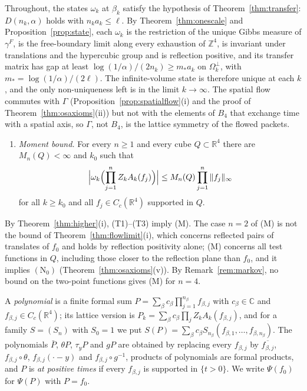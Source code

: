 \documentclass[aps,prd,twocolumn,superscriptaddress,nofootinbib,longbibliography,floatfix,amsmath,amssymb,10pt]{revtex4-2}
\theoremstyle{definition}
\theoremstyle{remark}
\newcommand{\R}{\mathbb{R}}
\newcommand{\Z}{\mathbb{Z}}
\newcommand{\C}{\mathbb{C}}
\begin{document}
Throughout, the states $\omega_k$ at $\beta_k$ satisfy the hypothesis of
Theorem~\ref{thm:transfer}: $D(n_k,\alpha)$ holds with $n_ka_k\le\ell$. By
Theorem~\ref{thm:onescale} and Proposition~\ref{prop:state}, each
$\omega_k$ is the restriction of the unique Gibbs measure of $\gamma^F$, is
the free-boundary limit along every exhaustion of $\Z^4$, is invariant under
translations and the hypercubic group and is reflection positive, and its
transfer matrix has gap at least $\log(1/\alpha)/(2n_k)\ge m_*a_k$ on
$\Omega_k^\perp$, with $m_*=\log(1/\alpha)/(2\ell)$. The infinite-volume
state is therefore unique at each $k$, and the only non-uniqueness left is
in the limit $k\to\infty$. The spatial flow commutes with $\Gamma$
(Proposition~\ref{prop:spatialflow}(i) and the proof of
Theorem~\ref{thm:osaxioms}(ii)) but not with the elements of $B_4$ that
exchange time with a spatial axis, so $\Gamma$, not $B_4$, is the lattice
symmetry of the flowed packets.

\begin{enumerate}[label=\textup{(M)},leftmargin=*]
\item \emph{Moment bound.} For every $n\ge1$ and every cube $Q\subset\R^4$
there are $M_n(Q)<\infty$ and $k_0$ such that
\[
\Bigl|\omega_k\Bigl(\prod_{j=1}^nZ_kA_k(f_j)\Bigr)\Bigr|\le
M_n(Q)\prod_{j=1}^n\|f_j\|_\infty
\]
for all $k\ge k_0$ and all $f_j\in C_c(\R^4)$ supported in $Q$.
\end{enumerate}

By Theorem~\ref{thm:higher}(i), (T1)--(T3) imply (M). The case $n=2$ of (M)
is not the bound of Theorem~\ref{thm:flowlimit}(i), which concerns reflected
pairs of translates of $f_0$ and holds by reflection positivity alone; (M)
concerns all test functions in $Q$, including those closer to the
reflection plane than $f_0$, and it implies $(\mathrm N_0)$
(Theorem~\ref{thm:osaxioms}(v)). By Remark~\ref{rem:markov}, no bound on the
two-point functions gives (M) for $n=4$.

A \emph{polynomial} is a finite formal sum $P=\sum_\beta c_\beta
\prod_{j=1}^{n_\beta}f_{\beta,j}$ with $c_\beta\in\C$ and $f_{\beta,j}\in
C_c(\R^4)$; its lattice version is $P_k=\sum_\beta c_\beta\prod_jZ_k
A_k(f_{\beta,j})$, and for a family $S=(S_n)$ with $S_0=1$ we put
$S(P)=\sum_\beta c_\beta S_{n_\beta}(f_{\beta,1},\dots,f_{\beta,n_\beta})$.
The polynomials $\bar P$, $\theta P$, $\tau_yP$ and $gP$ are obtained by
replacing every $f_{\beta,j}$ by $\overline{f_{\beta,j}}$,
$f_{\beta,j}\circ\theta$, $f_{\beta,j}(\cdot-y)$ and $f_{\beta,j}\circ
g^{-1}$, products of polynomials are formal products, and $P$ is \emph{at
positive times} if every $f_{\beta,j}$ is supported in $\{t>0\}$. We write
$\Psi(f_0)$ for $\Psi(P)$ with $P=f_0$.
\end{document}
